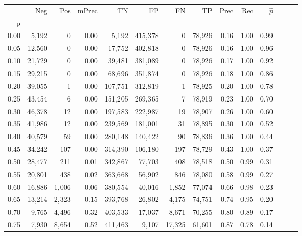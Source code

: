\begin{tabular}{rrrrrrrrrrrrrr}
\toprule
{} &     Neg &     Pos & mPrec &       TN &       FP &      FN &      TP &  Prec &   Rec & $\hat{p}$ \\
p    &         &         &       &          &          &         &         &       &       &           \\
\midrule
0.00 &   5,192 &       0 &  0.00 &    5,192 &  415,378 &       0 &  78,926 &  0.16 &  1.00 &      0.99 \\
0.05 &  12,560 &       0 &  0.00 &   17,752 &  402,818 &       0 &  78,926 &  0.16 &  1.00 &      0.96 \\
0.10 &  21,729 &       0 &  0.00 &   39,481 &  381,089 &       0 &  78,926 &  0.17 &  1.00 &      0.92 \\
0.15 &  29,215 &       0 &  0.00 &   68,696 &  351,874 &       0 &  78,926 &  0.18 &  1.00 &      0.86 \\
0.20 &  39,055 &       1 &  0.00 &  107,751 &  312,819 &       1 &  78,925 &  0.20 &  1.00 &      0.78 \\
0.25 &  43,454 &       6 &  0.00 &  151,205 &  269,365 &       7 &  78,919 &  0.23 &  1.00 &      0.70 \\
0.30 &  46,378 &      12 &  0.00 &  197,583 &  222,987 &      19 &  78,907 &  0.26 &  1.00 &      0.60 \\
0.35 &  41,986 &      12 &  0.00 &  239,569 &  181,001 &      31 &  78,895 &  0.30 &  1.00 &      0.52 \\
0.40 &  40,579 &      59 &  0.00 &  280,148 &  140,422 &      90 &  78,836 &  0.36 &  1.00 &      0.44 \\
0.45 &  34,242 &     107 &  0.00 &  314,390 &  106,180 &     197 &  78,729 &  0.43 &  1.00 &      0.37 \\
0.50 &  28,477 &     211 &  0.01 &  342,867 &   77,703 &     408 &  78,518 &  0.50 &  0.99 &      0.31 \\
0.55 &  20,801 &     438 &  0.02 &  363,668 &   56,902 &     846 &  78,080 &  0.58 &  0.99 &      0.27 \\
0.60 &  16,886 &   1,006 &  0.06 &  380,554 &   40,016 &   1,852 &  77,074 &  0.66 &  0.98 &      0.23 \\
0.65 &  13,214 &   2,323 &  0.15 &  393,768 &   26,802 &   4,175 &  74,751 &  0.74 &  0.95 &      0.20 \\
0.70 &   9,765 &   4,496 &  0.32 &  403,533 &   17,037 &   8,671 &  70,255 &  0.80 &  0.89 &      0.17 \\
0.75 &   7,930 &   8,654 &  0.52 &  411,463 &    9,107 &  17,325 &  61,601 &  0.87 &  0.78 &      0.14 \\

\end{tabular}
